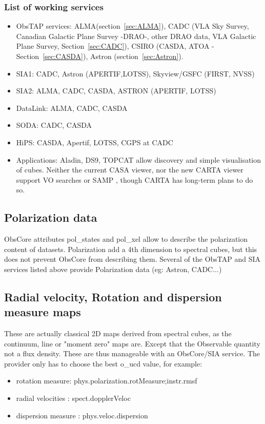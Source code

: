\documentclass[11pt,a4paper]{ivoa}
\begin{document}
\subsubsection{List of working services}
\begin{itemize}
\item ObsTAP services: ALMA(section~\ref{sec:ALMA}), CADC (VLA Sky Survey, Canadian Galactic Plane Survey -DRAO-, other DRAO data, VLA Galactic Plane Survey, Section~\ref{sec:CADC}), CSIRO (CASDA, ATOA - Section~\ref{sec:CASDA}), Astron (section~\ref{sec:Astron}).
\item SIA1: CADC, Astron (APERTIF,LOTSS), Skyview/GSFC (FIRST, NVSS)
\item SIA2: ALMA, CADC, CASDA, ASTRON (APERTIF, LOTSS)
\item DataLink: ALMA, CADC, CASDA
\item SODA: CADC, CASDA
\item HiPS: CASDA, Apertif, LOTSS, CGPS at CADC
\item Applications: Aladin, DS9, TOPCAT allow discovery and simple visualisation of cubes. Neither the current CASA viewer, nor the new CARTA viewer support VO searches or SAMP \citep{2009ivoa.spec.0421B}, though CARTA has long-term plans to do so.
\end{itemize}


\subsection{Polarization data}
 ObsCore attributes pol\_states and pol\_xel allow to describe the polarization content of datasets. Polarization add a 4th dimension to spectral cubes, but this does not prevent ObsCore from describing them. Several of the ObsTAP and SIA services listed above provide Polarization data (eg: Astron, CADC...)


\subsection{Radial velocity, Rotation and dispersion measure maps}

These are actually classical 2D maps derived from spectral cubes, as the continuum, line or "moment zero" maps are. Except that the Observable quantity not a flux density. These are thus manageable with an ObsCore/SIA service. The provider only has to choose the best o\_ucd value, for example:

\begin{itemize}
    \item rotation measure: phys.polarization.rotMeasure;instr.rmsf
    \item radial velocities : spect.dopplerVeloc
    \item dispersion measure : phys.veloc.dispersion
\end{itemize}
\end{document}
